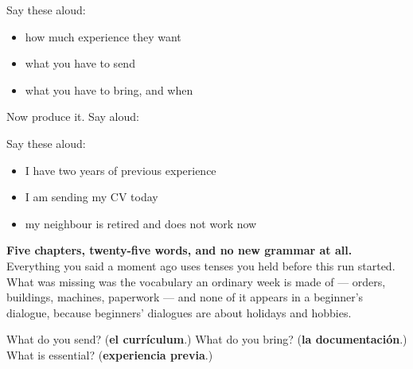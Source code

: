 Say these aloud:

\begin{itemize}
\raggedright
  \item how much experience they want
  \item what you have to send
  \item what you have to bring, and when
\end{itemize}

\begin{grammarlens}[title={What you've built}]
Now produce it. Say aloud:

Say these aloud:

\begin{itemize}
\raggedright
  \item I have two years of previous experience
  \item I am sending my CV today
  \item my neighbour is retired and does not work now
\end{itemize}

\textbf{Five chapters, twenty-five words, and no new grammar at all.} Everything you said a moment ago uses tenses you held before this run started. What was missing was the vocabulary an ordinary week is made of — orders, buildings, machines, paperwork — and none of it appears in a beginner's dialogue, because beginners' dialogues are about holidays and hobbies.
\end{grammarlens}

\begin{tcolorbox}[breakable,colback=teal!4,colframe=teal!35!black,title={Before you move on}]
What do you send? (\textbf{el currículum}.) What do you bring? (\textbf{la documentación}.) What is essential? (\textbf{experiencia previa}.)
\end{tcolorbox}
